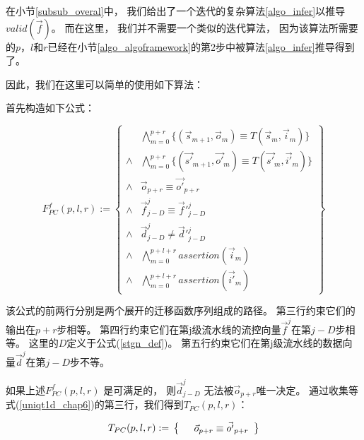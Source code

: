 在小节\ref{subsub_overal}中，
我们给出了一个迭代的复杂算法\ref{algo_infer}以推导$valid(\vec{f})$。
而在这里，
我们并不需要一个类似的迭代算法，
因为该算法所需要的$p$，$l$和$r$已经在小节\ref{algo_algoframework}的第2步中被算法\ref{algo_infer}推导得到了。

因此，我们在这里可以简单的使用如下算法：

首先构造如下公式：

\begin{equation}\label{uniqt1d_chap6}
F^f_{PC}(p,l,r):=
\left\{
\begin{array}{cc}
&\bigwedge_{m=0}^{p+r}
\{
(\vec{s}_{m+1},\vec{o}_m)\equiv T(\vec{s}_m,\vec{i}_m)
\}
\\
\wedge&\bigwedge_{m=0}^{p+r}
\{
(\vec{s'}_{m+1},\vec{o'}_m)\equiv T(\vec{s'}_m,\vec{i'}_m)
\}
\\
\wedge&\vec{o}_{p+r}\equiv \vec{o'}_{p+r} \\
\wedge& \vec{f}^j_{j-D}\equiv \vec{f}'^j_{j-D} \\
\wedge& \vec{d}^j_{j-D}\ne \vec{d}'^j_{j-D} \\
\wedge&\bigwedge_{m=0}^{p+l+r}assertion(\vec{i}_m) \\
\wedge&\bigwedge_{m=0}^{p+l+r}assertion(\vec{i'}_m)
\end{array}
\right\}
\end{equation}

该公式的前两行分别是两个展开的迁移函数序列组成的路径。
第三行约束它们的输出在$p+r$步相等。
第四行约束它们在第j级流水线的流控向量$\vec{f}^j$在第$j-D$步相等。
这里的$D$定义于公式(\ref{stgn_def})。
第五行约束它们在第j级流水线的数据向量$\vec{d}^j$在第$j-D$步不等。

如果上述$F^f_{PC}(p,l,r)$ 是可满足的，
则$\vec{d}^j_{j-D}$ 无法被$\vec{o}_{p+r}$唯一决定。
通过收集等式(\ref{uniqt1d_chap6})的第三行，我们得到$T_{PC}(p,l,r)$：

\begin{equation}\label{tpc_chap6}
T_{PC}(p,l,r):=\\
\left\{
\begin{array}{cc}
      &\vec{o}_{p+r}\equiv \vec{o'}_{p+r} \\
\end{array}
\right\}
\end{equation}

